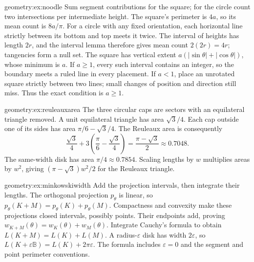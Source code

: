 \begin{solution}{geometry:ex:noodle}
\idea Sum segment contributions for the square; for the circle count two intersections per intermediate height.
\writeup The square's perimeter is $4a$, so its mean count is $8a/\pi$. For a circle with any fixed orientation, each horizontal line strictly between its bottom and top meets it twice. The interval of heights has length $2r$, and the interval lemma therefore gives mean count $2(2r)=4r$; tangencies form a null set. The square has vertical extent $a(|\sin\theta|+|\cos\theta|)$, whose minimum is $a$. If $a\ge1$, every such interval contains an integer, so the boundary meets a ruled line in every placement. If $a<1$, place an unrotated square strictly between two lines; small changes of position and direction still miss. Thus the exact condition is $a\ge1$.
\end{solution}

\begin{solution}{geometry:ex:reuleauxarea}
\idea The three circular caps are sectors with an equilateral triangle removed.
\writeup A unit equilateral triangle has area $\sqrt3/4$. Each cap outside one of its sides has area $\pi/6-\sqrt3/4$. The Reuleaux area is consequently
\[
\frac{\sqrt3}{4}+3\left(\frac\pi6-\frac{\sqrt3}{4}\right)
=\frac{\pi-\sqrt3}{2}\approx0.7048.
\]
The same-width disk has area $\pi/4\approx0.7854$. Scaling lengths by $w$ multiplies areas by $w^2$, giving $(\pi-\sqrt3)w^2/2$ for the Reuleaux triangle.
\end{solution}

\begin{solution}{geometry:ex:minkowskiwidth}
\idea Add the projection intervals, then integrate their lengths.
\writeup The orthogonal projection $p_\theta$ is linear, so $p_\theta(K+M)=p_\theta(K)+p_\theta(M)$. Compactness and convexity make these projections closed intervals, possibly points. Their endpoints add, proving $w_{K+M}(\theta)=w_K(\theta)+w_M(\theta)$. Integrate Cauchy's formula to obtain $L(K+M)=L(K)+L(M)$. A radius-$\varepsilon$ disk has width $2\varepsilon$, so
$L(K+\varepsilon\mathbb B)=L(K)+2\pi\varepsilon$. The formula includes $\varepsilon=0$ and the segment and point perimeter conventions.
\end{solution}

